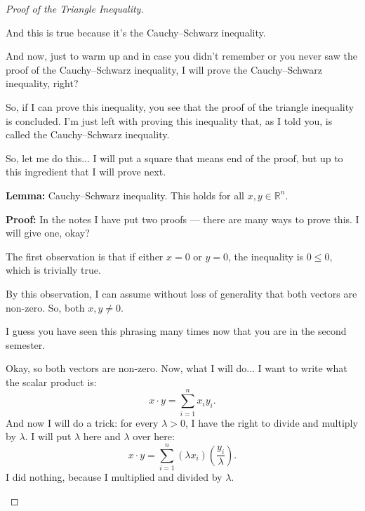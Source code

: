 \begin{proof}[Proof of the Triangle Inequality]
\begin{spoken-clean}[01:01:21 - 01:04:54]
And this is true because it's the Cauchy--Schwarz inequality.

And now, just to warm up and in case you didn't remember or you never saw the proof of the Cauchy--Schwarz inequality, I will prove the Cauchy--Schwarz inequality, right?

So, if I can prove this inequality, you see that the proof of the triangle inequality is concluded. I'm just left with proving this inequality that, as I told you, is called the Cauchy--Schwarz inequality.

So, let me do this... I will put a square that means end of the proof, but up to this ingredient that I will prove next.

\textbf{Lemma:} Cauchy--Schwarz inequality. This holds for all $x, y \in \mathbb{R}^n$.

\textbf{Proof:} In the notes I have put two proofs --- there are many ways to prove this. I will give one, okay?

The first observation is that if either $x = 0$ or $y = 0$, the inequality is $0 \le 0$, which is trivially true.

By this observation, I can assume without loss of generality that both vectors are non-zero. So,  both $x, y \neq 0$.

I guess you have seen this  phrasing many times now that you are in the second semester.
\end{spoken-clean}

\begin{math-stroke}
\end{math-stroke}

\begin{spoken-clean}[01:04:54 - 01:08:19]
Okay, so both vectors are non-zero. Now, what I will do... I want to write what the scalar product is:
\[
x \cdot y = \sum_{i=1}^n x_i y_i.
\]
And now I will do a trick: for every $\lambda > 0$, I have the right to divide and multiply by $\lambda$. I will put $\lambda$ here and $\lambda$ over here:
\[
x \cdot y = \sum_{i=1}^n (\lambda x_i) \left( \frac{y_i}{\lambda} \right).
\]
I did nothing, because I multiplied and divided by $\lambda$.


\end{spoken-clean}
\end{proof}
